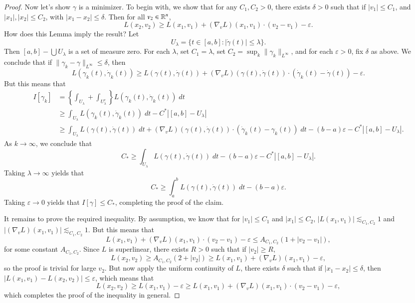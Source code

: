 \begin{proof}
    Now let's show $\gamma$ is a minimizer. To begin with, we show that for any $C_1, C_2 > 0$, there exists $\delta > 0$ such that if $|v_1| \leq C_1$, and $|x_1|, |x_2| \leq C_2$, with $|x_1 - x_2| \leq \delta$. Then for all $v_2 \in \operatorname{\mathbb{R}}^n$,
    \[ L(x_2,v_2) \geq L(x_1,v_1) + (\nabla_v L)(x_1,v_1) \cdot (v_2 - v_1) - \varepsilon. \]
    How does this Lemma imply the result? Let
    \[ U_\lambda = \{ t \in [a,b]: |\dot{\gamma}(t)| \leq \lambda \}. \]
    Then $[a,b] - \bigcup U_\lambda$ is a set of measure zero. For each $\lambda$, set $C_1 = \lambda$, set $C_2 = \sup_k \| \gamma_k \|_{L^\infty}$, and for each $\varepsilon > 0$, fix $\delta$ as above. We conclude that if $\| \gamma_k - \gamma \|_{L^\infty} \leq \delta$, then
    \[ L(\gamma_k(t), \dot{\gamma}_k(t)) \geq L(\gamma(t), \dot{\gamma}(t)) + (\nabla_v L)(\gamma(t), \dot{\gamma}(t)) \cdot (\dot{\gamma}_k(t) - \dot{\gamma}(t)) - \varepsilon. \]
    But this means that
    \begin{align*}
        I[\gamma_k] &= \left\{ \int_{U_\lambda} + \int_{U_\lambda^c} \right\} L(\gamma_k(t), \dot{\gamma}_k(t))\; dt\\
        &\geq \int_{U_\lambda} L(\gamma_k(t), \dot{\gamma}_k(t))\; dt - C^* |[a,b] - U_\lambda|\\
        &\geq \int_{U_\lambda} L(\gamma(t), \dot{\gamma}(t))\; dt + (\nabla_v L)(\gamma(t), \dot{\gamma}(t)) \cdot (\dot{\gamma}_k(t) - \gamma_k(t))\; dt - (b - a) \varepsilon - C^* |[a,b] - U_\lambda|.
    \end{align*}
    As $k \to \infty$, we conclude that
    \[ C_* \geq \int_{U_\lambda} L(\gamma(t), \dot{\gamma}(t))\; dt - (b - a) \varepsilon - C^* |[a,b] - U_\lambda|. \]
    Taking $\lambda \to \infty$ yields that
    \[ C_* \geq \int_a^b L(\gamma(t), \dot{\gamma}(t))\; dt - (b - a) \varepsilon. \]
    Taking $\varepsilon \to 0$ yields that $I[\gamma] \leq C_*$, completing the proof of the claim.

    It remains to prove the required inequality. By assumption, we know that for $|v_1| \leq C_1$ and $|x_1| \leq C_2$, $|L(x_1,v_1)| \lesssim_{C_1,C_2} 1$ and $|(\nabla_v L)(x_1,v_1)| \lesssim_{C_1,C_2} 1$. But this means that
    \[ L(x_1,v_1) + (\nabla_v L)(x_1,v_1) \cdot (v_2 - v_1) - \varepsilon \leq A_{C_1,C_2} (1 + |v_2 - v_1|), \]
    for some constant $A_{C_1,C_2}$. Since $L$ is superlinear, there exists $R > 0$ such that if $|v_2| \geq R$,
    \[ L(x_2,v_2) \geq A_{C_1,C_2} (2 + |v_2|) \geq L(x_1,v_1) + (\nabla_v L)(x_1,v_1) - \varepsilon, \]
    so the proof is trivial for large $v_2$. But now apply the uniform continuity of $L$, there exists $\delta$ such that if $|x_1 - x_2| \leq \delta$, then $|L(x_1,v_1) - L(x_2,v_2)| \leq \varepsilon$, which means that
    \[ L(x_2,v_2) \geq L(x_1,v_1) - \varepsilon \geq L(x_1,v_1) + (\nabla_v L)(x_1,v_1) \cdot (v_2 - v_1) - \varepsilon, \]
    which completes the proof of the inequality in general.
\end{proof}

